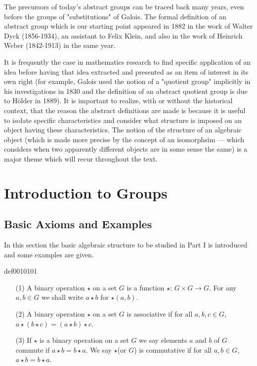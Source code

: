 \documentclass[cn,11pt,chinese]{elegantbook}
\numberwithin{equation}{section}
\begin{document}
The precursors of today's abstract groups can be traced back many years, even before the groups of "substitutions" of Galois. The formal definition of an abstract group which is our starting point appeared in 1882 in the work of Walter Dyck (1856-1934), an assistant to Felix Klein, and also in the work of Heinrich Weber (1842-1913) in the same year.

It is frequently the case in mathematics research to find specific application of an idea before having that idea extracted  and presented as an item of interest in its own right (for example, Galois used the notion of a "quotient group" implicitly in his investigations in 1830 and the definition of an abstract quotient group is due to H\"older in 1889). It is important to realize, with or without the historical context, that the reason the abstract definitions are made is because it is useful to isolate specific characteristics and consider what structure is imposed on an object having these characteristics. The notion of the structure of an algebraic object (which is made more precise by the concept of an isomorphsim --- which considers when two apparently different objects are in some sense the same) is a major theme which will recur throughout the text.


\chapter{Introduction to Groups}\label{chapter001}
\section{Basic Axioms and Examples}\label{section00101}
In this section the basic algebraic structure to be studied in Part I is introduced and some examples are given.

\begin{definition}{}{def0010101}
\begin{enumerate}
\item[(1)] A binary operation $\star$ on a set $G$ is a function $\star$: $G \times G \to G$. For any $a, b \in G$ we shall write $a \star b$ for $\star(a, b)$. 

\item[(2)] A binary operation $\star$ on a set $G$ is associative if for all $a,b, c \in G$, $a \star (b \star c) = (a \star b) \star c$.

\item[(3)] If $\star$ is a binary operation on a set $G$ we say elements $a$ and $b$ of $G$ commute if $a \star b = b \star a$. We say $\star$(or $G$) is commutative if for all $a,b \in G$, $a \star b = b \star a$.
\end{enumerate}
\end{definition}
\end{document}
